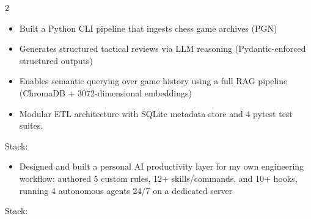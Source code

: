 \documentclass[10pt,a4paper,ragged2e,withhyper]{altacv}
\begin{document}
\begin{paracol}{2}




\begin{itemize}
\item Built a Python CLI pipeline that ingests chess game archives (PGN)
\item Generates structured tactical reviews via LLM reasoning (Pydantic-enforced structured outputs)
\item Enables semantic querying over game history using a full RAG pipeline (ChromaDB + 3072-dimensional embeddings)
\item Modular ETL architecture with SQLite metadata store and 4 pytest test suites.
\end{itemize}

\smallskip
Stack:    

\divider

\begin{itemize}
\item Designed and built a personal AI productivity layer for my own engineering workflow: authored 5 custom rules, 12+ skills/commands, and 10+ hooks, running 4 autonomous agents 24/7 on a dedicated server
\end{itemize}

\smallskip
Stack:    

\smallskip



\end{paracol}
\end{document}
